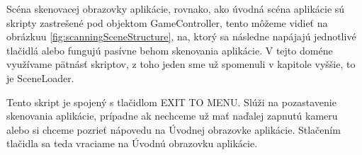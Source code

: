 Scéna skenovacej obrazovky aplikácie, rovnako, ako úvodná scéna aplikácie sú skripty zastrešené pod objektom GameController, tento môžeme vidieť na obrázkuu \ref{fig:scanningSceneStructure}, na, ktorý sa následne napájajú jednotlivé tlačidlá alebo fungujú pasívne behom skenovania aplikácie. V tejto doméne využívame pätnásť skriptov, z toho jeden sme už spomenuli v kapitole vyššie, to je SceneLoader.

Tento skript je spojený s tlačidlom EXIT TO MENU. Slúži na pozastavenie skenovania aplikácie, prípadne ak nechceme už mať naďalej zapnutú kameru alebo si chceme pozrieť nápovedu na Úvodnej obrazovke aplikácie. Stlačením tlačidla sa teda vraciame na Úvodnú obrazovku aplikácie. 

